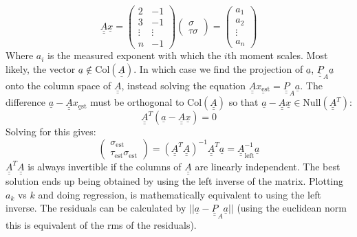 \documentclass[twoside]{article}
\begin{document}
\[
\underline{\underline{A}}
\underline{x} =
\begin{pmatrix}
2 & -1 \\
3  & -1 \\
\vdots & \vdots \\
n & -1
\end{pmatrix}
\begin{pmatrix}
\sigma \\
\tau \sigma
\end{pmatrix}
= \begin{pmatrix}
a_1 \\
a_2 \\
\vdots \\
a_n
\end{pmatrix}
\]
Where $a_i$ is the measured exponent with which the $i$th moment scales. Most likely, the vector $\underline{a} \not\in \text{Col}(\underline{\underline{A}} )$. In which case we find the projection of $\underline{a}$, $\underline{\underline{P}}_A \underline{a}$ onto the column space of  $\underline{\underline{A}}$, instead solving the equation $\underline{\underline{A}}\underline{x_{\text{est} }} = \underline{\underline{P}}_A \underline{a}$. The difference $ \underline{a}-\underline{\underline{A}}\underline{x_{\text{est} }}$ must be orthogonal to $\text{Col}(\underline{\underline{A}})$ so that $\underline{a}-\underline{\underline{A}}\underline{x} \in \text{Null} (\underline{\underline{A}}^T)$:
\[
\underline{\underline{A}}^T( \underline{a}-\underline{\underline{A}}\underline{x}) =0
\]
Solving for this gives:
\[
\begin{pmatrix}
\sigma_{\text{est}} \\
\tau_{\text{est}} \sigma_{\text{est}}
\end{pmatrix}=
(\underline{\underline{A}}^T\underline{\underline{A}})^{-1} \underline{\underline{A}}^T \underline{a}
 = \underline{\underline{A}}_{\text{left}}^{-1} \underline{a} 
\]
$\underline{\underline{A}}^T\underline{\underline{A}}$ is always invertible if the columns of $\underline{\underline{A}}$ are linearly independent. The best solution ends up being obtained by using the left inverse of the matrix. Plotting $a_{k}$ vs $k$ and doing regression, is mathematically equivalent to using the left inverse. The residuals can be calculated by $||\underline{a}- \underline{\underline{P}}_A\underline{a} ||$ (using the euclidean norm this is equivalent of the rms of the residuals).
\end{document}
